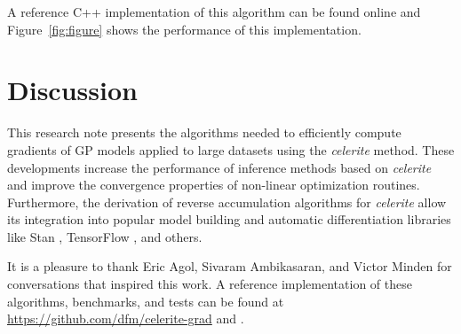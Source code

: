 \documentclass[rnaas]{aastex62}
\newcommand{\figureref}[1]{\ref{fig:#1}}
\newcommand{\Figure}[1]{Figure~\figureref{#1}}
\begin{document}
\noindent A reference C++ implementation of this algorithm can be found online
\citep{Foreman-Mackey:2018} and \Figure{figure} shows the performance of this
implementation.

\newpage
\section{Discussion}

This research note presents the algorithms needed to efficiently compute
gradients of GP models applied to large datasets using the \emph{celerite}
method.
These developments increase the performance of inference methods based on
\emph{celerite} and improve the convergence properties of non-linear
optimization routines.
Furthermore, the derivation of reverse accumulation algorithms for
\emph{celerite} allow its integration into popular model building and
automatic differentiation libraries like Stan \citep{Carpenter:2015},
TensorFlow \citep{Abadi:2016}, and others.

\acknowledgments
It is a pleasure to thank
Eric Agol,
Sivaram Ambikasaran, and
Victor Minden
for conversations that inspired this work.
A reference implementation of these algorithms, benchmarks, and tests can be
found at \url{https://github.com/dfm/celerite-grad} and
\citet{Foreman-Mackey:2018}.
\end{document}
